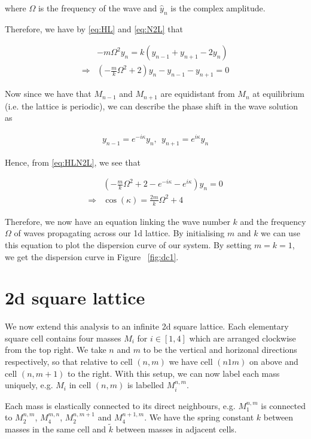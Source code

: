 where $\Omega$ is the frequency of the wave and $\hat{y}_{n}$ is the complex
amplitude.

Therefore, we have by \eqref{eq:HL} and \eqref{eq:N2L} that

\begin{align}
  &-m\Omega^{2}y_{n}=k\left(y_{n-1}+y_{n+1}-2y_{n}\right) \\
  \Rightarrow &\left(-\frac{m}{k}\Omega^{2}+2\right)y_{n}-y_{n-1}-y_{n+1}=0
    \label{eq:HLN2L}
\end{align}

Now since we have that $M_{n-1}$ and $M_{n+1}$ are equidistant from $M_{n}$ at
equilibrium (i.e. the lattice is periodic), we can describe the phase shift in
the wave solution as

\begin{align}
  y_{n-1}=e^{-i\kappa}y_n,\ \ y_{n+1}=e^{i\kappa}y_n
\end{align}

Hence, from \eqref{eq:HLN2L}, we see that

\begin{align}
  &\left(-\frac{m}{k}\Omega^{2}+2-e^{-i\kappa}-e^{i\kappa}\right)y_{n}=0 \\
  \Rightarrow &\cos\left(\kappa\right)=\frac{2m}{k}\Omega^{2}+4
\end{align}

Therefore, we now have an equation linking the wave number $k$ and the
frequency $\Omega$ of waves propagating across our 1d lattice. By initialising
$m$ and $k$ we can use this equation to plot the dispersion curve of our
system. By setting $m=k=1$, we get the dispersion curve in Figure
~\ref{fig:dc1}.

\section{2d square lattice}
We now extend this analysis to an infinite 2d square lattice. Each elementary
square cell contains four masses $M_i$ for $i\in\left[1, 4\right]$ which are
arranged clockwise from the top right. We take $n$ and $m$ to be the vertical
and horizonal directions respectively, so that relative to cell $(n, m)$ we
have cell $(n 1 m)$ on above and cell $(n,m+1)$ to the right. With this setup,
we can now label each mass uniquely, e.g. $M_i$ in cell $(n, m)$ is labelled
$M_i^{n,m}$.

Each mass is elastically connected to its direct neighbours, e.g. $M_1^{n,m}$
is connected to $M_2^{n,m}$, $M_4^{m,n}$, $M_2^{n,m+1}$ and $M_4^{n+1,m}$. We
have the spring constant $k$ between masses in the same cell and $\tilde{k}$
between masses in adjacent cells.

